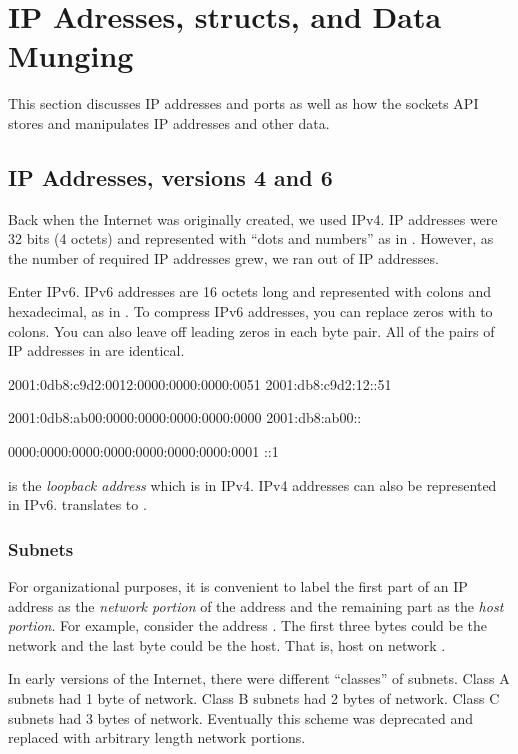 \section{IP Adresses, structs, and Data Munging}
This section discusses IP addresses and ports as well as how the sockets API stores and manipulates IP addresses and other data.

\subsection{IP Addresses, versions 4 and 6}
Back when the Internet was originally created, we used IPv4. IP addresses were 32 bits (4 octets) and represented with ``dots and numbers'' as in . However, as the number of required IP addresses grew, we ran out of IP addresses. 

Enter IPv6. IPv6 addresses are 16 octets long and represented with colons and hexadecimal, as in . To compress IPv6 addresses, you can replace zeros with to colons. You can also leave off leading zeros in each byte pair. All of the pairs of IP addresses in  are identical.

\begin{CPP}[label=list:ip-address-pairs,caption=Identical IP Addresses]
2001:0db8:c9d2:0012:0000:0000:0000:0051
2001:db8:c9d2:12::51

2001:0db8:ab00:0000:0000:0000:0000:0000
2001:db8:ab00::

0000:0000:0000:0000:0000:0000:0000:0001
::1
\end{CPP}

 is the \emph{loopback address} which is  in IPv4. IPv4 addresses can also be represented in IPv6.  translates to .

\subsubsection{Subnets}
For organizational purposes, it is convenient to label the first part of an IP address as the \emph{network portion} of the address and the remaining part as the \emph{host portion}. For example, consider the address . The first three bytes could be the network and the last byte could be the host. That is, host  on network .

In early versions of the Internet, there were different ``classes'' of subnets. Class A subnets had 1 byte of network. Class B subnets had 2 bytes of network. Class C subnets had 3 bytes of network. Eventually this scheme was deprecated and replaced with arbitrary length network portions. 

